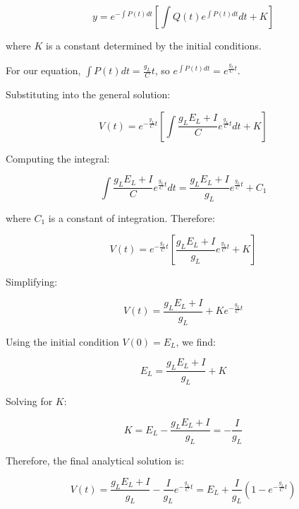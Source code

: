 \documentclass[11pt,a4paper]{article}
\begin{document}
\begin{equation}
y = e^{-\int P(t) dt} \left[ \int Q(t) e^{\int P(t) dt} dt + K \right]
\end{equation}

where $K$ is a constant determined by the initial conditions.

For our equation, $\int P(t) dt = \frac{g_L}{C}t$, so $e^{\int P(t) dt} = e^{\frac{g_L}{C}t}$.

Substituting into the general solution:

\begin{equation}
V(t) = e^{-\frac{g_L}{C}t} \left[ \int \frac{g_L E_L + I}{C} e^{\frac{g_L}{C}t} dt + K \right]
\end{equation}

Computing the integral:

\begin{equation}
\int \frac{g_L E_L + I}{C} e^{\frac{g_L}{C}t} dt = \frac{g_L E_L + I}{g_L} e^{\frac{g_L}{C}t} + C_1
\end{equation}

where $C_1$ is a constant of integration. Therefore:

\begin{equation}
V(t) = e^{-\frac{g_L}{C}t} \left[ \frac{g_L E_L + I}{g_L} e^{\frac{g_L}{C}t} + K \right]
\end{equation}

Simplifying:

\begin{equation}
V(t) = \frac{g_L E_L + I}{g_L} + K e^{-\frac{g_L}{C}t}
\end{equation}

Using the initial condition $V(0) = E_L$, we find:

\begin{equation}
E_L = \frac{g_L E_L + I}{g_L} + K
\end{equation}

Solving for $K$:

\begin{equation}
K = E_L - \frac{g_L E_L + I}{g_L} = -\frac{I}{g_L}
\end{equation}

Therefore, the final analytical solution is:

\begin{equation}
V(t) = \frac{g_L E_L + I}{g_L} - \frac{I}{g_L} e^{-\frac{g_L}{C}t} = E_L + \frac{I}{g_L} (1 - e^{-\frac{g_L}{C}t})
\end{equation}
\end{document}
